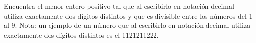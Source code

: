Encuentra el menor entero positivo tal que al escribirlo en notación decimal utiliza exactamente dos dígitos distintos y que es divisible entre los números del 1 al 9.
Nota: un ejemplo de un número que al escribirlo en notación decimal utiliza exactamente
dos dígitos distintos es el 1121211222.